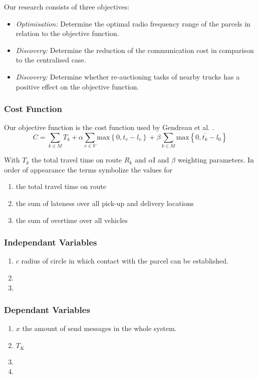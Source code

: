 \documentclass[../main.tex]{subfiles}
\begin{document}
Our research consists of three objectives:
\begin{itemize}
	\item \textit{Optimisation:} Determine the optimal radio frequency range of the parcels in relation to the objective function.
	\item \textit{Discovery:} Determine the reduction of the communication cost in comparison to the centralised case.
	\item \textit{Discovery:} Determine whether re-auctioning tasks of nearby trucks has a positive effect on the objective function.
\end{itemize}

\subsubsection{Cost Function}
Our objective function is the cost function used by Gendreau et al. \cite{gendreau2006neighborhood}.
$$
C = \sum_{k \in M}{T_k} + \alpha \sum_{v \in V} \text{max} \left\{ 0, t_v - l_v \right\} + \beta \sum_{k \in M} \text{max} \left\{0, \bar{t_k} - l_0 \right\}
$$

With $T_k$ the total travel time on route $R_k$ and $\alpha$I and $\beta$ weighting parameters. In order of appearance the terms symbolize the values for
\begin{enumerate}
	\item the total travel time on route
	\item the sum of lateness over all pick-up and delivery locations
	\item the sum of overtime over all vehicles
\end{enumerate}


\subsubsection{Independant Variables }
\begin{enumerate}
	\item $c$ radius of circle in which contact with the parcel can be established.
	\item
	\item
\end{enumerate}
\subsubsection{Dependant Variables}
\begin{enumerate}
	\item $x$ the amount of send messages in the whole system.
	\item $T_K$
	\item
	\item
\end{enumerate}
\end{document}
